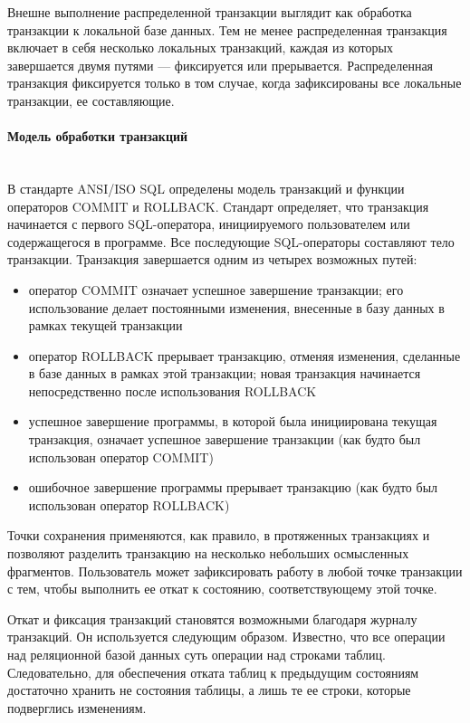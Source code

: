 Внешне выполнение распределенной транзакции выглядит как обработка транзакции к локальной базе данных. Тем не менее распределенная транзакция включает в себя несколько локальных транзакций, каждая из которых завершается двумя путями — фиксируется или прерывается. Распределенная транзакция фиксируется только в том случае, когда зафиксированы все локальные транзакции, ее составляющие.

\paragraph{Модель обработки транзакций} ~\\
В стандарте ANSI/ISO SQL определены модель транзакций и функции операторов COMMIT и ROLLBACK.
Стандарт определяет, что транзакция начинается с первого SQL-оператора, инициируемого пользователем или содержащегося
в программе. Все последующие SQL-операторы составляют тело транзакции. Транзакция завершается одним из четырех
возможных путей:
\begin{itemize}
    \item оператор COMMIT означает успешное завершение транзакции; его использование делает постоянными изменения, внесенные в базу данных в рамках текущей транзакции
    \item оператор ROLLBACK прерывает транзакцию, отменяя изменения, сделанные в базе данных в рамках этой транзакции; новая транзакция начинается непосредственно после использования ROLLBACK
    \item успешное завершение программы, в которой была инициирована текущая транзакция, означает успешное завершение транзакции (как будто был использован оператор COMMIT)
    \item ошибочное завершение программы прерывает транзакцию (как будто был использован оператор ROLLBACK)
\end{itemize}

Точки сохранения применяются, как правило, в протяженных транзакциях и позволяют разделить транзакцию на несколько
небольших осмысленных фрагментов. Пользователь может зафиксировать работу в любой точке транзакции с тем,
чтобы выполнить ее откат к состоянию, соответствующему этой точке.

Откат и фиксация транзакций становятся возможными благодаря журналу транзакций. Он используется следующим образом.
Известно, что все операции над реляционной базой данных суть операции над строками таблиц. Следовательно,
для обеспечения отката таблиц к предыдущим состояниям достаточно хранить не состояния таблицы, а лишь те
ее строки, которые подверглись изменениям.

